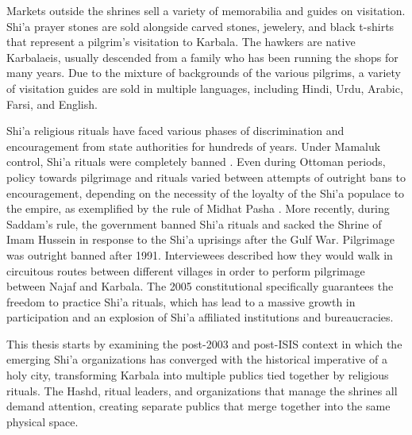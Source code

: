 Markets outside the shrines sell a variety of memorabilia and guides on visitation. Shi'a prayer stones are sold alongside carved stones, jewelery, and black t-shirts that represent a pilgrim's visitation to Karbala. The hawkers are native Karbalaeis, usually descended from a family who has been running the shops for many years. Due to the mixture of backgrounds of the various pilgrims, a variety of visitation guides are sold in multiple languages, including Hindi, Urdu, Arabic, Farsi, and English. 

Shi'a religious rituals have faced various phases of discrimination and encouragement from state authorities for hundreds of years. Under Mamaluk control, Shi'a rituals were completely banned \cite{yitzhak_nakash_attempt_1993}. Even during Ottoman periods, policy towards pilgrimage and rituals varied between attempts of outright bans to encouragement, depending on the necessity of the loyalty of the Shi'a populace to the empire, as exemplified by the rule of Midhat Pasha \cite{aghaie_martyrs_2004}. More recently, during Saddam's rule, the government banned Shi'a rituals and sacked the Shrine of Imam Hussein in response to the Shi'a uprisings after the Gulf War. Pilgrimage was outright banned after 1991. Interviewees described how they would walk in circuitous routes between different villages in order to perform pilgrimage between Najaf and Karbala. The 2005 constitutional specifically guarantees the freedom to practice Shi'a rituals, which has lead to a massive growth in participation and an explosion of Shi'a affiliated institutions and bureaucracies. 

This thesis starts by examining the post-2003 and post-ISIS context in which the emerging Shi'a organizations has converged with the historical imperative of a holy city, transforming Karbala into multiple publics tied together by religious rituals. The Hashd, ritual leaders, and organizations that manage the shrines all demand attention, creating separate publics that merge together into the same physical space. 